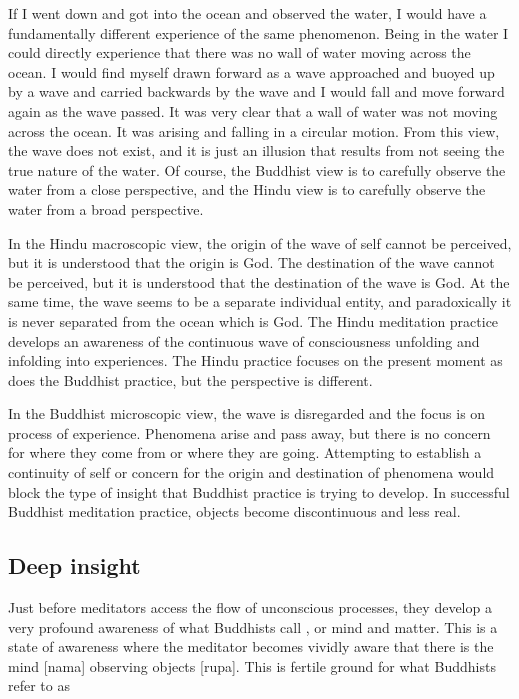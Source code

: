 \documentclass[a5paper,10pt,english]{book}
\begin{document}
\sphinxAtStartPar
If I went down and got into the ocean and observed the water, I would
have a fundamentally different experience of the same phenomenon. Being
in the water I could directly experience that there was no wall of water
moving across the ocean. I would find myself drawn forward as a wave
approached and buoyed up by a wave and carried backwards by the wave and
I would fall and move forward again as the wave passed. It was very
clear that a wall of water was not moving across the ocean. It was
arising and falling in a circular motion. From this view, the wave does
not exist, and it is just an illusion that results from not seeing the
true nature of the water. Of course, the Buddhist view is to carefully
observe the water from a close perspective, and the Hindu view is to
carefully observe the water from a broad perspective.

\sphinxAtStartPar
In the Hindu macroscopic view, the origin of the wave of self cannot be
perceived, but it is understood that the origin is God. The destination
of the wave cannot be perceived, but it is understood that the
destination of the wave is God. At the same time, the wave seems to be a
separate individual entity, and paradoxically it is never separated from
the ocean which is God. The Hindu meditation practice develops an
awareness of the continuous wave of consciousness unfolding and
infolding into experiences. The Hindu practice focuses on the present
moment as does the Buddhist practice, but the perspective is different.

\sphinxAtStartPar
In the Buddhist microscopic view, the wave is disregarded and the focus
is on process of experience. Phenomena arise and pass away, but there is
no concern for where they come from or where they are going. Attempting
to establish a continuity of self or concern for the origin and
destination of phenomena would block the type of insight that Buddhist
practice is trying to develop. In successful Buddhist meditation
practice, objects become discontinuous and less real.


\subsection{Deep insight}
\label{\detokenize{saints:deep-insight}}
\sphinxAtStartPar
Just before meditators access the flow of unconscious processes, they
develop a very profound awareness of what Buddhists call ,
or mind and matter. This is a state of awareness where the meditator
becomes vividly aware that there is the mind {[}nama{]} observing objects
{[}rupa{]}. This is fertile ground for what Buddhists refer to as 
\end{document}
